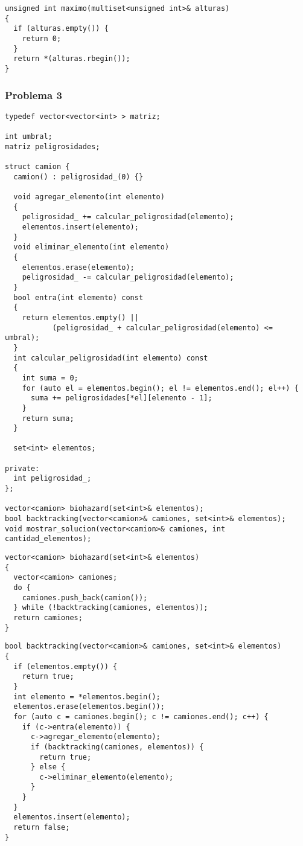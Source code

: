 \documentclass[a4paper]{article}
\begin{document}
\vspace*{0.5cm}

\begin{lstlisting}
unsigned int maximo(multiset<unsigned int>& alturas)
{
  if (alturas.empty()) {
    return 0;
  }
  return *(alturas.rbegin());
}
\end{lstlisting}

\newpage

\subsubsection{Problema 3}



\vspace*{0.5cm}

\begin{lstlisting}
typedef vector<vector<int> > matriz;

int umbral;
matriz peligrosidades;

struct camion {
  camion() : peligrosidad_(0) {}

  void agregar_elemento(int elemento)
  {
    peligrosidad_ += calcular_peligrosidad(elemento);
    elementos.insert(elemento);
  }
  void eliminar_elemento(int elemento)
  {
    elementos.erase(elemento);
    peligrosidad_ -= calcular_peligrosidad(elemento);
  }
  bool entra(int elemento) const
  {
    return elementos.empty() ||
           (peligrosidad_ + calcular_peligrosidad(elemento) <= umbral);
  }
  int calcular_peligrosidad(int elemento) const
  {
    int suma = 0;
    for (auto el = elementos.begin(); el != elementos.end(); el++) {
      suma += peligrosidades[*el][elemento - 1];
    }
    return suma;
  }

  set<int> elementos;

private:
  int peligrosidad_;
};

vector<camion> biohazard(set<int>& elementos);
bool backtracking(vector<camion>& camiones, set<int>& elementos);
void mostrar_solucion(vector<camion>& camiones, int cantidad_elementos);
\end{lstlisting}

\vspace*{0.5cm}

\begin{lstlisting}
vector<camion> biohazard(set<int>& elementos)
{
  vector<camion> camiones;
  do {
    camiones.push_back(camion());
  } while (!backtracking(camiones, elementos));
  return camiones;
}
\end{lstlisting}

\newpage

\begin{lstlisting}
bool backtracking(vector<camion>& camiones, set<int>& elementos)
{
  if (elementos.empty()) {
    return true;
  }
  int elemento = *elementos.begin();
  elementos.erase(elementos.begin());
  for (auto c = camiones.begin(); c != camiones.end(); c++) {
    if (c->entra(elemento)) {
      c->agregar_elemento(elemento);
      if (backtracking(camiones, elementos)) {
        return true;
      } else {
        c->eliminar_elemento(elemento);
      }
    }
  }
  elementos.insert(elemento);
  return false;
}
\end{lstlisting}
\end{document}
